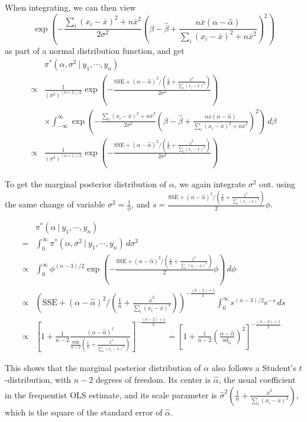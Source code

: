 \documentclass[]{book}
\theoremstyle{definition}
\theoremstyle{definition}
\theoremstyle{definition}
\theoremstyle{remark}
\begin{document}
When integrating, we can then view
\[ \exp\left(-\frac{\sum_i (x_i-\bar{x})^2+n\bar{x}^2}{2\sigma^2}\left(\beta-\hat{\beta}+\frac{n\bar{x}(\alpha-\hat{\alpha})}{\sum_i (x_i-\bar{x})^2+n\bar{x}^2}\right)^2\right) \]
as part of a normal distribution function, and get \[
\begin{aligned}
& \pi^*(\alpha, \sigma^2~|~y_1,\cdots,y_n) \\
\propto & \frac{1}{(\sigma^2)^{(n+2)/2}}\exp\left(-\frac{\text{SSE}+(\alpha-\hat{\alpha})^2/(\frac{1}{n}+\frac{\bar{x}^2}{\sum_i (x_i-\bar{x})^2})}{2\sigma^2}\right)\\
& \times\int_{-\infty}^\infty \exp\left(-\frac{\sum_i (x_i-\bar{x})^2+n\bar{x}^2}{2\sigma^2}\left(\beta-\hat{\beta}+\frac{n\bar{x}(\alpha-\hat{\alpha})}{\sum_i (x_i-\bar{x})^2+n\bar{x}^2}\right)^2\right)\, d\beta \\
\propto & \frac{1}{(\sigma^2)^{(n+1)/2}}\exp\left(-\frac{\text{SSE}+(\alpha-\hat{\alpha})^2/(\frac{1}{n}+\frac{\bar{x}^2}{\sum_i (x_i-\bar{x})^2})}{2\sigma^2}\right)
\end{aligned}
\]

To get the marginal posterior distribution of \(\alpha\), we again
integrate \(\sigma^2\) out. using the same change of variable
\(\displaystyle \sigma^2=\frac{1}{\phi}\), and
\(s=\displaystyle \frac{\text{SSE}+(\alpha-\hat{\alpha})^2/(\frac{1}{n}+\frac{\bar{x}^2}{\sum_i (x_i-\bar{x})^2})}{2}\phi\).

\[
\begin{aligned}
& \pi^*(\alpha~|~y_1,\cdots,y_n) \\
= & \int_0^\infty \pi^*(\alpha, \sigma^2~|~y_1,\cdots, y_n)\, d\sigma^2 \\
\propto & \int_0^\infty \phi^{(n-3)/2}\exp\left(-\frac{\text{SSE}+(\alpha-\hat{\alpha})^2/(\frac{1}{n}+\frac{\bar{x}^2}{\sum_i (x_i-\bar{x})^2})}{2}\phi\right)\, d\phi\\
\propto & \left(\text{SSE}+(\alpha-\hat{\alpha})^2/(\frac{1}{n}+\frac{\bar{x}^2}{\sum_i (x_i-\bar{x})^2})\right)^{-\frac{(n-2)+1}{2}}\int_0^\infty s^{(n-3)/2}e^{-s}\, ds\\
\propto & \left[1+\frac{1}{n-2}\frac{(\alpha-\hat{\alpha})^2}{\frac{\text{SSE}}{n-2}\left(\frac{1}{n}+\frac{\bar{x}^2}{\sum_i (x_i-\bar{x})^2}\right)}\right]^{-\frac{(n-2)+1}{2}} = \left[1 + \frac{1}{n-2}\left(\frac{\alpha-\hat{\alpha}}{\text{sd}_{\hat{\alpha}}}\right)^2\right]^{-\frac{(n-2)+1}{2}}
\end{aligned}
\]

This shows that the marginal posterior distribution of \(\alpha\) also
follows a Student's \(t\)-distribution, with \(n-2\) degrees of freedom.
Its center is \(\hat{\alpha}\), the usual coefficient in the frequentist
OLS estimate, and its scale parameter is
\(\displaystyle \hat{\sigma}^2\left(\frac{1}{n}+\frac{\bar{x}^2}{\sum_i (x_i-\bar{x})^2}\right)\),
which is the square of the standard error of \(\hat{\alpha}\).
\end{document}
